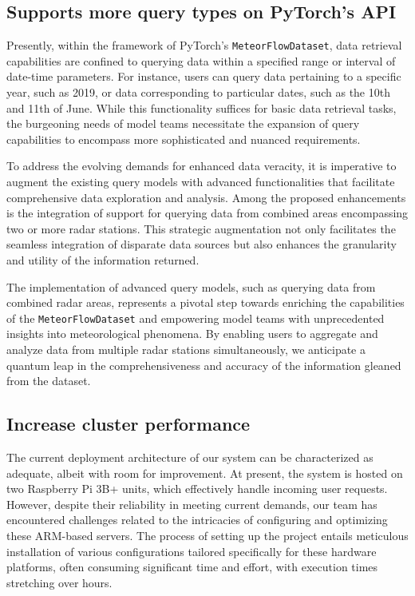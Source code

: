 \subsection{Supports more query types on PyTorch's API}

Presently, within the framework of PyTorch's \texttt{MeteorFlowDataset}, data
retrieval capabilities are confined to querying data within a specified range or
interval of date-time parameters. For instance, users can query data pertaining
to a specific year, such as 2019, or data corresponding to particular dates,
such as the 10th and 11th of June. While this functionality suffices for basic
data retrieval tasks, the burgeoning needs of model teams necessitate the
expansion of query capabilities to encompass more sophisticated and nuanced
requirements.

To address the evolving demands for enhanced data veracity, it is imperative to
augment the existing query models with advanced functionalities that facilitate
comprehensive data exploration and analysis. Among the proposed enhancements is
the integration of support for querying data from combined areas encompassing
two or more radar stations. This strategic augmentation not only facilitates the
seamless integration of disparate data sources but also enhances the granularity
and utility of the information returned.

The implementation of advanced query models, such as querying data from combined
radar areas, represents a pivotal step towards enriching the capabilities of the
\texttt{MeteorFlowDataset} and empowering model teams with unprecedented
insights into meteorological phenomena. By enabling users to aggregate and
analyze data from multiple radar stations simultaneously, we anticipate a
quantum leap in the comprehensiveness and accuracy of the information gleaned
from the dataset.



\subsection{Increase cluster performance}
The current deployment architecture of our system can be characterized as
adequate, albeit with room for improvement. At present, the system is hosted on
two Raspberry Pi 3B+ units, which effectively handle incoming user requests.
However, despite their reliability in meeting current demands, our team has
encountered challenges related to the intricacies of configuring and optimizing
these ARM-based servers. The process of setting up the project entails
meticulous installation of various configurations tailored specifically for
these hardware platforms, often consuming significant time and effort, with
execution times stretching over hours.

